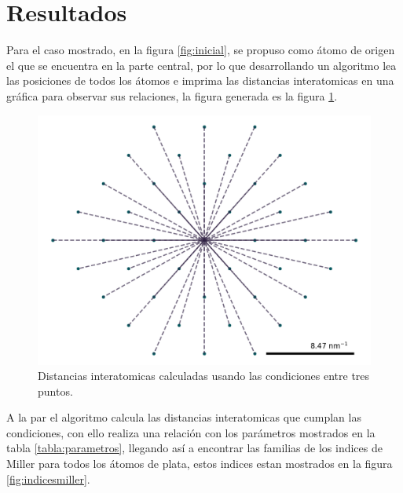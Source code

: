\documentclass[reprint,amsmath,amssymb,aps,]{revtex4-2}
\begin{document}
\section{Resultados}
Para el caso mostrado, en la figura \ref{fig:inicial}, se propuso como átomo de origen el que se encuentra en la parte central, por lo que
desarrollando un algoritmo lea las posiciones de todos los átomos e imprima las distancias interatomicas en una gráfica para observar sus relaciones,
la figura generada es la figura \ref{fig:distancias}.
\begin{figure}[H]
    \centering
    \includegraphics[scale=0.4]{../Graphics/distancia.png}
    \caption{Distancias interatomicas calculadas usando las condiciones entre tres puntos.}
    \label{fig:distancias}
\end{figure}
A la par el algoritmo calcula las distancias interatomicas que cumplan las condiciones, con ello realiza una relación con los parámetros mostrados en la tabla \ref{tabla:parametros},
llegando así a encontrar las familias de los indices de Miller para todos los átomos de plata, estos indices estan mostrados en la 
figura \ref{fig:indicesmiller}. \\
\end{document}
